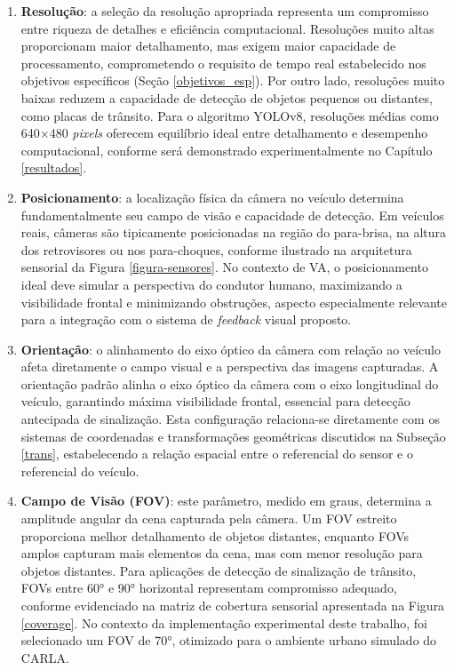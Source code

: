 \begin{enumerate}
    \item \textbf{Resolução}: a seleção da resolução apropriada representa um compromisso entre riqueza de detalhes e eficiência computacional. Resoluções muito altas proporcionam maior detalhamento, mas exigem maior capacidade de processamento, comprometendo o requisito de tempo real estabelecido nos objetivos específicos (Seção \ref{objetivos_esp}). Por outro lado, resoluções muito baixas reduzem a capacidade de detecção de objetos pequenos ou distantes, como placas de trânsito. Para o algoritmo YOLOv8, resoluções médias como 640×480 \textit{pixels} oferecem equilíbrio ideal entre detalhamento e desempenho computacional, conforme será demonstrado experimentalmente no Capítulo \ref{resultados}.
    
    \item \textbf{Posicionamento}: a localização física da câmera no veículo determina fundamentalmente seu campo de visão e capacidade de detecção. Em veículos reais, câmeras são tipicamente posicionadas na região do para-brisa, na altura dos retrovisores ou nos para-choques, conforme ilustrado na arquitetura sensorial da Figura \ref{figura-sensores}. No contexto de VA, o posicionamento ideal deve simular a perspectiva do condutor humano, maximizando a visibilidade frontal e minimizando obstruções, aspecto especialmente relevante para a integração com o sistema de \textit{feedback} visual proposto.
    
    \item \textbf{Orientação}: o alinhamento do eixo óptico da câmera com relação ao veículo afeta diretamente o campo visual e a perspectiva das imagens capturadas. A orientação padrão alinha o eixo óptico da câmera com o eixo longitudinal do veículo, garantindo máxima visibilidade frontal, essencial para detecção antecipada de sinalização. Esta configuração relaciona-se diretamente com os sistemas de coordenadas e transformações geométricas discutidos na Subseção \ref{trans}, estabelecendo a relação espacial entre o referencial do sensor e o referencial do veículo.
    
    \item \textbf{Campo de Visão (FOV)}: este parâmetro, medido em graus, determina a amplitude angular da cena capturada pela câmera. Um FOV estreito proporciona melhor detalhamento de objetos distantes, enquanto FOVs amplos capturam mais elementos da cena, mas com menor resolução para objetos distantes. Para aplicações de detecção de sinalização de trânsito, FOVs entre 60° e 90° horizontal representam compromisso adequado, conforme evidenciado na matriz de cobertura sensorial apresentada na Figura \ref{coverage}. No contexto da implementação experimental deste trabalho, foi selecionado um FOV de 70°, otimizado para o ambiente urbano simulado do CARLA.
\end{enumerate}

